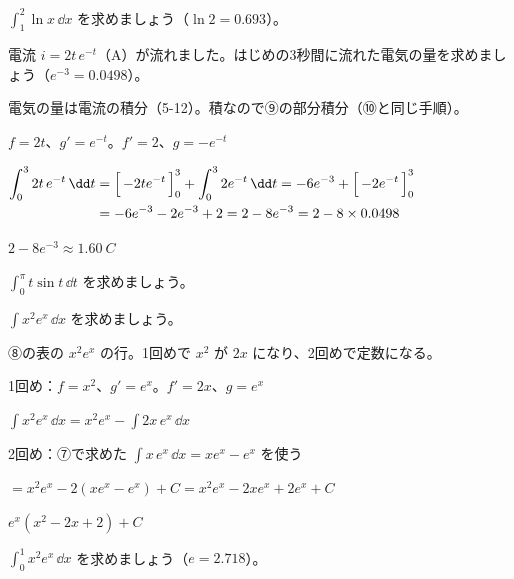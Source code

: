 \begin{jibun}
$\displaystyle\int_1^2\ln x\,\dd x$ を求めましょう（$\ln2=0.693$）。
\end{jibun}

\begin{reidai}
電流 $i=2t\,e^{-t}$（A）が流れました。はじめの3秒間に流れた電気の量を求めましょう（$e^{-3}=0.0498$）。\par
\kangaekata 電気の量は電流の積分（5-12）。積なので⑨の部分積分（⑩と同じ手順）。\par
\shiki $f=2t$、$g'=e^{-t}$。$f'=2$、$g=-e^{-t}$\par
\hspace*{2.6\zw}$\begin{aligned}[t]\int_0^32t\,e^{-t}\,\dd t&=\Bigl[\,-2te^{-t}\,\Bigr]_0^3+\int_0^32e^{-t}\,\dd t=-6e^{-3}+\Bigl[\,-2e^{-t}\,\Bigr]_0^3\\
&=-6e^{-3}-2e^{-3}+2=2-8e^{-3}=2-8\times0.0498\end{aligned}$\par
\kotae $2-8e^{-3}\approx\qty{1.60}{C}$
\end{reidai}

\begin{jibun}
$\displaystyle\int_0^{\pi}t\sin t\,\dd t$ を求めましょう。
\end{jibun}

\begin{reidai}
$\displaystyle\int x^2e^x\,\dd x$ を求めましょう。\par
\kangaekata ⑧の表の $x^2e^x$ の行。1回めで $x^2$ が $2x$ になり、2回めで定数になる。\par
\shiki 1回め：$f=x^2$、$g'=e^x$。$f'=2x$、$g=e^x$\par
\hspace*{4.6\zw}$\displaystyle\int x^2e^x\,\dd x=x^2e^x-\int2x\,e^x\,\dd x$\par
\hspace*{2.6\zw}2回め：⑦で求めた $\displaystyle\int x\,e^x\,\dd x=xe^x-e^x$ を使う\par
\hspace*{4.6\zw}$=x^2e^x-2(xe^x-e^x)+C=x^2e^x-2xe^x+2e^x+C$\par
\kotae $e^x(x^2-2x+2)+C$
\end{reidai}

\begin{jibun}
$\displaystyle\int_0^1x^2e^x\,\dd x$ を求めましょう（$e=2.718$）。
\end{jibun}

